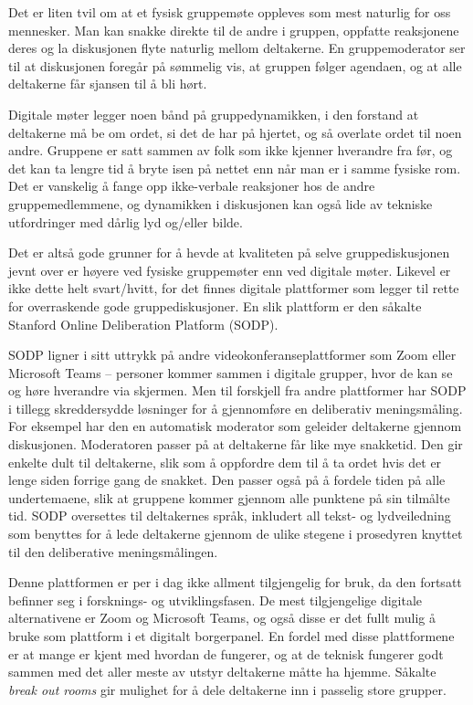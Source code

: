 \documentclass[
  12pt,
  a4paper, 12pt]{article}
\begin{document}
Det er liten tvil om at et fysisk gruppemøte oppleves som mest naturlig for oss mennesker. Man kan snakke direkte til de andre i gruppen, oppfatte reaksjonene deres og la diskusjonen flyte naturlig mellom deltakerne. En gruppemoderator ser til at diskusjonen foregår på sømmelig vis, at gruppen følger agendaen, og at alle deltakerne får sjansen til å bli hørt.

Digitale møter legger noen bånd på gruppedynamikken, i den forstand at deltakerne må be om ordet, si det de har på hjertet, og så overlate ordet til noen andre. Gruppene er satt sammen av folk som ikke kjenner hverandre fra før, og det kan ta lengre tid å bryte isen på nettet enn når man er i samme fysiske rom. Det er vanskelig å fange opp ikke-verbale reaksjoner hos de andre gruppemedlemmene, og dynamikken i diskusjonen kan også lide av tekniske utfordringer med dårlig lyd og/eller bilde.

Det er altså gode grunner for å hevde at kvaliteten på selve gruppediskusjonen jevnt over er høyere ved fysiske gruppemøter enn ved digitale møter. Likevel er ikke dette helt svart/hvitt, for det finnes digitale plattformer som legger til rette for overraskende gode gruppediskusjoner. En slik plattform er den såkalte Stanford Online Deliberation Platform (SODP).

SODP ligner i sitt uttrykk på andre videokonferanseplattformer som Zoom eller Microsoft Teams -- personer kommer sammen i digitale grupper, hvor de kan se og høre hverandre via skjermen. Men til forskjell fra andre plattformer har SODP i tillegg skreddersydde løsninger for å gjennomføre en deliberativ meningsmåling. For eksempel har den en automatisk moderator som geleider deltakerne gjennom diskusjonen. Moderatoren passer på at deltakerne får like mye snakketid. Den gir enkelte dult til deltakerne, slik som å oppfordre dem til å ta ordet hvis det er lenge siden forrige gang de snakket. Den passer også på å fordele tiden på alle undertemaene, slik at gruppene kommer gjennom alle punktene på sin tilmålte tid. SODP oversettes til deltakernes språk, inkludert all tekst- og lydveiledning som benyttes for å lede deltakerne gjennom de ulike stegene i prosedyren knyttet til den deliberative meningsmålingen.

Denne plattformen er per i dag ikke allment tilgjengelig for bruk, da den fortsatt befinner seg i forsknings- og utviklingsfasen. De mest tilgjengelige digitale alternativene er Zoom og Microsoft Teams, og også disse er det fullt mulig å bruke som plattform i et digitalt borgerpanel. En fordel med disse plattformene er at mange er kjent med hvordan de fungerer, og at de teknisk fungerer godt sammen med det aller meste av utstyr deltakerne måtte ha hjemme. Såkalte \emph{break out rooms} gir mulighet for å dele deltakerne inn i passelig store grupper.
\end{document}
